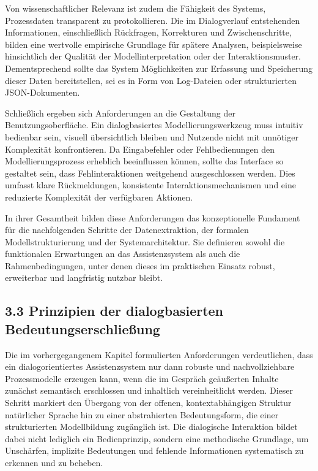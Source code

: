 \documentclass[a4paper,12pt]{scrreprt}
\begin{document}
Von wissenschaftlicher Relevanz ist zudem die Fähigkeit des Systems, Prozessdaten transparent zu protokollieren. Die im Dialogverlauf entstehenden Informationen, einschließlich Rückfragen, Korrekturen und Zwischenschritte, bilden eine wertvolle empirische Grundlage für spätere Analysen, beispielsweise hinsichtlich der Qualität der Modellinterpretation oder der Interaktionsmuster. Dementsprechend sollte das System Möglichkeiten zur Erfassung und Speicherung dieser Daten bereitstellen, sei es in Form von Log-Dateien oder strukturierten JSON-Dokumenten.

Schließlich ergeben sich Anforderungen an die Gestaltung der Benutzungsoberfläche. Ein dialogbasiertes Modellierungswerkzeug muss intuitiv bedienbar sein, visuell übersichtlich bleiben und Nutzende nicht mit unnötiger Komplexität konfrontieren. Da Eingabefehler oder Fehlbedienungen den Modellierungsprozess erheblich beeinflussen können, sollte das Interface so gestaltet sein, dass Fehlinteraktionen weitgehend ausgeschlossen werden. Dies umfasst klare Rückmeldungen, konsistente Interaktionsmechanismen und eine reduzierte Komplexität der verfügbaren Aktionen.

In ihrer Gesamtheit bilden diese Anforderungen das konzeptionelle Fundament für die nachfolgenden Schritte der Datenextraktion, der formalen Modellstrukturierung und der Systemarchitektur. Sie definieren sowohl die funktionalen Erwartungen an das Assistenzsystem als auch die Rahmenbedingungen, unter denen dieses im praktischen Einsatz robust, erweiterbar und langfristig nutzbar bleibt.

\subsection*{3.3 Prinzipien der dialogbasierten Bedeutungserschließung}

Die im vorhergegangenem Kapitel formulierten Anforderungen verdeutlichen, dass ein dialogorientiertes Assistenzsystem nur dann robuste und nachvollziehbare Prozessmodelle erzeugen kann, wenn die im Gespräch geäußerten Inhalte zunächst semantisch erschlossen und inhaltlich vereinheitlicht werden. Dieser Schritt markiert den Übergang von der offenen, kontextabhängigen Struktur natürlicher Sprache hin zu einer abstrahierten Bedeutungsform, die einer strukturierten Modellbildung zugänglich ist. Die dialogische Interaktion bildet dabei nicht lediglich ein Bedienprinzip, sondern eine methodische Grundlage, um Unschärfen, implizite Bedeutungen und fehlende Informationen systematisch zu erkennen und zu beheben.
\end{document}
